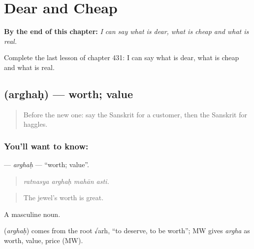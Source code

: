 
\chapter{Dear and Cheap}
\label{ch:sa-dear-and-cheap}

\begin{chapteropening}
\textbf{By the end of this chapter:} \emph{I can say what is dear, what is cheap and what is real.}

Complete the last lesson of chapter 431: I can say what is dear, what is cheap and what is real.
\end{chapteropening}

\section[\texorpdfstring{\sk{अर्घः} (arghaḥ)}{अर्घः (arghaḥ)}]{ (arghaḥ) — worth; value}

\label{lesson:SA-C431-arghah}



\begin{quote}
Before the new one: say the Sanskrit for a customer, then the Sanskrit for haggles.
\end{quote}

\subsection*{You'll want to know: }
\textbf{} — \emph{arghaḥ} — \textquotedblleft{}worth; value\textquotedblright{}.

\begin{quote}
   
\end{quote}

\begin{quote}
\emph{ratnasya arghaḥ mahān asti.}
\end{quote}

\begin{quote}
The jewel's worth is great.
\end{quote}

A masculine noun.

\begin{cousinweb}
\textbf{} (\emph{arghaḥ}) comes from the root √arh, \textquotedblleft{}to deserve, to be worth\textquotedblright{}; MW gives \emph{argha} as worth, value, price (MW).
\end{cousinweb}

